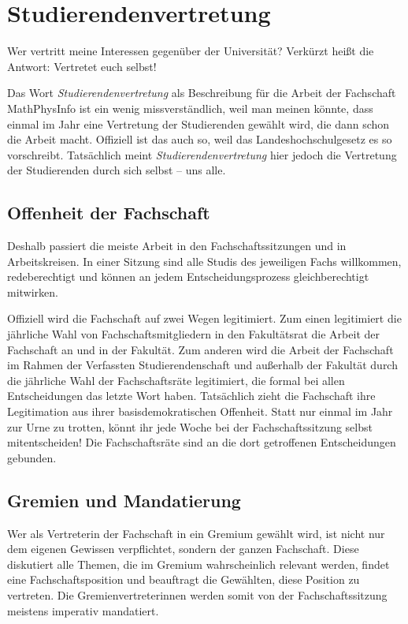 
\vspace*{-2mm}
\section[Studierendenvertretung in der Fachschaft]{Studierendenvertretung}
\vspace*{-1mm}
Wer vertritt meine Interessen gegenüber der Universität? Verkürzt heißt die Antwort: Vertretet euch selbst!

Das Wort \emph{Studierendenvertretung} als Beschreibung für die Arbeit der Fachschaft MathPhysInfo ist ein wenig missverständlich, weil man meinen könnte, dass einmal im Jahr eine Vertretung der Studierenden gewählt wird, die dann schon die Arbeit macht. Offiziell ist das auch so, weil das Landeshochschulgesetz es so vorschreibt. Tatsächlich meint \emph{Studierendenvertretung} hier jedoch die Vertretung der Studierenden durch sich selbst -- uns alle.

\vspace*{-2mm}
\subsection{Offenheit der Fachschaft}
Deshalb passiert die meiste Arbeit in den Fachschaftssitzungen und in Arbeitskreisen. In einer Sitzung sind alle Studis des jeweiligen Fachs willkommen, redeberechtigt und können an jedem Entscheidungsprozess gleichberechtigt mitwirken.

Offiziell wird die Fachschaft auf zwei Wegen legitimiert. Zum einen legitimiert die jährliche Wahl von Fachschaftsmitgliedern in den Fakultätsrat die Arbeit der Fachschaft an und in der Fakultät. Zum anderen wird die Arbeit der Fachschaft im Rahmen der Verfassten Studierendenschaft und außerhalb der Fakultät durch die jährliche Wahl der Fachschaftsräte legitimiert, die formal bei allen Entscheidungen das letzte Wort haben. Tatsächlich zieht die Fachschaft ihre Legitimation aus ihrer basisdemokratischen Offenheit. Statt nur einmal im Jahr zur Urne zu trotten, könnt ihr jede Woche bei der Fachschaftssitzung selbst mitentscheiden! Die Fachschaftsräte sind an die dort getroffenen Entscheidungen gebunden.



\vspace*{-2mm}
\subsection{Gremien und Mandatierung}
Wer als Vertreterin der Fachschaft in ein Gremium gewählt wird, ist nicht nur dem eigenen Gewissen verpflichtet, sondern der ganzen Fachschaft. Diese diskutiert alle Themen, die im Gremium wahrscheinlich relevant werden, findet eine Fachschaftsposition und beauftragt die Gewählten, diese Position zu vertreten. Die Gremienvertreterinnen werden somit von der Fachschaftssitzung meistens imperativ mandatiert.

